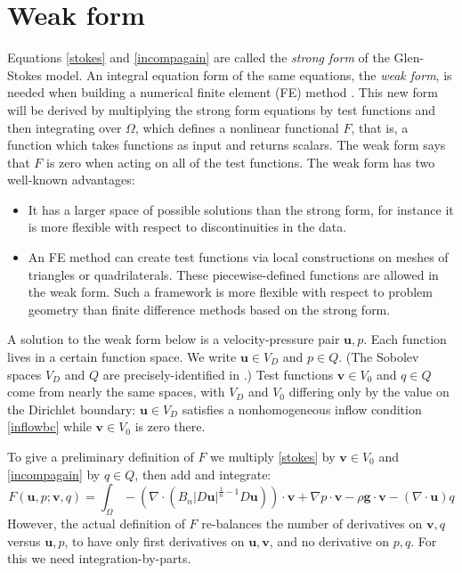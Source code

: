 \documentclass[letterpaper,final,12pt,reqno]{amsart}
\newcommand{\bu}{\mathbf{u}}
\newcommand{\bv}{\mathbf{v}}
\begin{document}
\section{Weak form} \label{sec:weakform}

Equations \eqref{stokes} and \eqref{incompagain} are called the \emph{strong form} of the Glen-Stokes model.  An integral equation form of the same equations, the \emph{weak form}, is needed when building a numerical finite element (FE) method \cite{Elmanetal2014}.  This new form will be derived by multiplying the strong form equations by test functions and then integrating over $\Omega$, which defines a nonlinear functional $F$, that is, a function which takes functions as input and returns scalars.  The weak form says that $F$ is zero when acting on all of the test functions.  The weak form has two well-known advantages:
\begin{itemize}
\item It has a larger space of possible solutions than the strong form, for instance it is more flexible with respect to discontinuities in the data.
\item An FE method can create test functions via local constructions on meshes of triangles or quadrilaterals.  These piecewise-defined functions are allowed in the weak form.  Such a framework is more flexible with respect to problem geometry than finite difference methods based on the strong form.
\end{itemize}

A solution to the weak form below is a velocity-pressure pair $\bu,p$.  Each function lives in a certain function space.  We write $\bu\in V_D$ and $p \in Q$.  (The Sobolev spaces $V_D$ and $Q$ are precisely-identified in \cite{JouvetRappaz2011}.)  Test functions $\bv\in V_0$ and $q\in Q$ come from nearly the same spaces, with $V_D$ and $V_0$ differing only by the value on the Dirichlet boundary: $\bu\in V_D$ satisfies a nonhomogeneous inflow condition \eqref{inflowbc} while $\bv\in V_0$ is zero there.

To give a preliminary definition of $F$ we multiply \eqref{stokes} by $\bv\in V_0$ and \eqref{incompagain} by $q\in Q$, then add and integrate:
\begin{equation}
F(\bu,p;\bv,q) = \int_\Omega - \left(\nabla \cdot \left(B_n |D\bu|^{\frac{1}{n} - 1} D\bu\right)\right)\cdot \bv + \nabla p \cdot \bv - \rho \mathbf{g} \cdot \bv - \left(\nabla \cdot \bu\right) q \label{nonfuncone}
\end{equation}
However, the actual definition of $F$ re-balances the number of derivatives on $\bv,q$ versus $\bu,p$, to have only first derivatives on $\bu,\bv$, and no derivative on $p,q$.  For this we need integration-by-parts.
\end{document}
